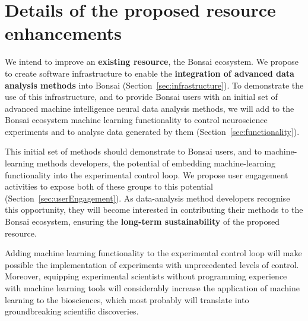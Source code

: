 

\section{Details of the proposed resource enhancements}





We intend to improve an \textbf{existing resource}, the Bonsai ecosystem. We
propose to create software infrastructure to enable the\textbf{ integration of advanced data analysis methods} into
Bonsai (Section~\ref{sec:infrastructure}).
%
To demonstrate the use of this infrastructure, and to provide Bonsai users with
an initial set of advanced machine intelligence neural data analysis methods,
we will add to the Bonsai ecosystem machine learning functionality to control
neuroscience experiments and to analyse data generated by them
(Section~\ref{sec:functionality}).

This initial set of methods should demonstrate to Bonsai users, and to
machine-learning methods developers, the potential of embedding
machine-learning functionality into the experimental control loop. We propose
user engagement activities to expose both of these groups to this
potential (Section~\ref{sec:userEngagement}).  As data-analysis method
developers recognise this opportunity, they will become interested in
contributing their methods to the Bonsai ecosystem, ensuring the
\textbf{long-term sustainability} of the proposed resource.

Adding machine learning functionality to the experimental control loop will
make possible the implementation of experiments with unprecedented levels of
control. Moreover, equipping experimental scientists without programming
experience with machine learning tools will considerably increase the
application of machine learning to the biosciences, which most probably will
translate into groundbreaking scientific discoveries.


